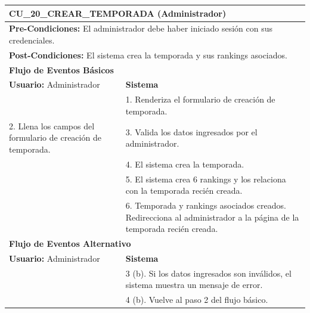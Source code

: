 \begin{center}
  \begin{tabular}{| p{7.5cm} | p{7.5cm} |}
    \hline
    \multicolumn{2}{|p{15cm}|}{\textbf{CU\_20\_CREAR\_TEMPORADA} (Administrador)} \\ \hline
    \multicolumn{2}{|p{15cm}|}{\textbf{Pre-Condiciones:} El administrador debe haber iniciado sesión con sus credenciales.} \\ \hline
    \multicolumn{2}{|p{15cm}|}{\textbf{Post-Condiciones:} El sistema crea la temporada y sus rankings asociados.} \\ \hline
    \multicolumn{2}{|p{7.5cm}|}{\textbf{Flujo de Eventos Básicos}} \\ \hline
    \multicolumn{1}{|p{7.5cm}|}{\textbf{Usuario:} Administrador} & \multicolumn{1}{|p{7.5cm}|}{\textbf{Sistema}} \\ \hline
    
    \multicolumn{1}{|p{7.5cm}|}{} & 
    \multicolumn{1}{|p{7.5cm}|}{1. Renderiza el formulario de creación de temporada.}\\ \hline
    
    \multicolumn{1}{|p{7.5cm}|}{2. Llena los campos del formulario de creación de temporada.}& 
    \multicolumn{1}{|p{7.5cm}|}{3. Valida los datos ingresados por el administrador.}\\ \hline
    
    \multicolumn{1}{|p{7.5cm}|}{} & 
    \multicolumn{1}{|p{7.5cm}|}{4. El sistema crea la temporada.}\\ \hline
    
    \multicolumn{1}{|p{7.5cm}|}{} & 
    \multicolumn{1}{|p{7.5cm}|}{5. El sistema crea 6 rankings y los relaciona con la temporada recién creada.}\\ \hline
    
    \multicolumn{1}{|p{7.5cm}|}{} & 
    \multicolumn{1}{|p{7.5cm}|}{6. Temporada y rankings asociados creados. Redirecciona al administrador a la página de la temporada recién creada.}\\ \hline
    
    \multicolumn{2}{|p{7.5cm}|}{\textbf{Flujo de Eventos Alternativo}} \\ \hline
    
    \multicolumn{1}{|p{7.5cm}|}{\textbf{Usuario:} Administrador} & \multicolumn{1}{|p{7.5cm}|}{\textbf{Sistema}} \\ \hline
    
    \multicolumn{1}{|p{7.5cm}|}{} & 
    \multicolumn{1}{|p{7.5cm}|}{3 (b). Si los datos ingresados son inválidos, el sistema muestra un mensaje de error.}\\ \hline
    
    \multicolumn{1}{|p{7.5cm}|}{} & 
    \multicolumn{1}{|p{7.5cm}|}{4 (b). Vuelve al paso 2 del flujo básico.}\\ \hline
  \end{tabular}
\end{center}


